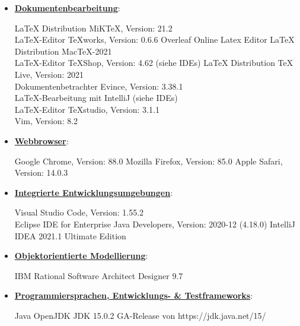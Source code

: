\documentclass{article}
\begin{document}
\begin{itemize}
\item \underline{\textbf{Dokumentenbearbeitung}}: 
\begin{flushleft}
LaTeX Distribution MiKTeX, Version: 21.2 \\
LaTeX-Editor TeXworks, Version: 0.6.6 \linebreak
Overleaf Online Latex Editor \linebreak
LaTeX Distribution MacTeX-2021 \\
LaTeX-Editor TeXShop, Version: 4.62 (siehe IDEs) \linebreak
LaTeX Distribution TeX Live, Version: 2021 \\
Dokumentenbetrachter Evince, Version: 3.38.1 \\
LaTeX-Bearbeitung mit IntelliJ (siehe IDEs) \\
LaTeX-Editor TeXstudio, Version: 3.1.1 \\
Vim, Version: 8.2 \\
\end{flushleft}
\item \underline{\textbf{Webbrowser}}:
\begin{flushleft}
Google Chrome, Version: 88.0 \linebreak
Mozilla Firefox, Version: 85.0 \linebreak
Apple Safari, Version: 14.0.3 \linebreak
\end{flushleft}
\item \underline{\textbf{Integrierte Entwicklungsumgebungen}}: 
\begin{flushleft}
Visual Studio Code, Version: 1.55.2 \\
Eclipse IDE for Enterprise Java Developers, Version: 2020-12 (4.18.0) \linebreak
IntelliJ IDEA 2021.1 Ultimate Edition \linebreak
\end{flushleft}
\item \underline{\textbf{Objektorientierte Modellierung}}: 
\begin{flushleft}
IBM Rational Software Architect Designer 9.7 \linebreak
\end{flushleft}
\item \underline{\textbf{Programmiersprachen, Entwicklungs- \& Testframeworks}}: 
\begin{flushleft}
Java OpenJDK JDK 15.0.2 GA-Release von https://jdk.java.net/15/\linebreak

\end{flushleft}
\end{itemize}
\end{document}

